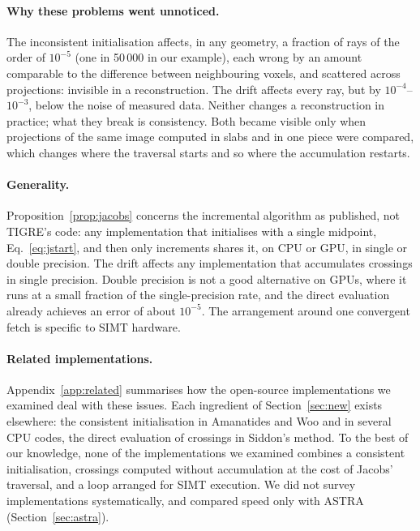 \documentclass[11pt,a4paper]{article}
\theoremstyle{remark}
\begin{document}
\paragraph{Why these problems went unnoticed.} The inconsistent initialisation affects, in any geometry, a
fraction of rays of the order of $10^{-5}$ (one in 50\,000 in our example), each wrong by an amount comparable
to the difference between neighbouring voxels, and scattered across projections: invisible in a
reconstruction. The drift affects every ray, but by $10^{-4}$--$10^{-3}$, below the noise of measured data.
Neither changes a reconstruction in practice; what they break is consistency. Both became visible only when
projections of the same image computed in slabs and in one piece were compared, which changes where the
traversal starts and so where the accumulation restarts.

\paragraph{Generality.} Proposition~\ref{prop:jacobs} concerns the incremental algorithm as published, not
TIGRE's code: any implementation that initialises with a single midpoint, Eq.~\eqref{eq:jstart}, and then
only increments shares it, on CPU or GPU, in single or double precision. The drift affects any implementation
that accumulates crossings in single precision. Double precision is not a good alternative on GPUs, where it
runs at a small fraction of the single-precision rate, and the direct evaluation already achieves an error of
about $10^{-5}$. The arrangement around one convergent fetch is specific to SIMT hardware.

\paragraph{Related implementations.} Appendix~\ref{app:related} summarises how the open-source
implementations we examined deal with these issues. Each ingredient of Section~\ref{sec:new} exists
elsewhere: the consistent initialisation in Amanatides and Woo and in several CPU codes, the direct
evaluation of crossings in Siddon's method. To the best of our knowledge, none of the implementations we
examined combines a consistent initialisation, crossings computed without accumulation at the cost of
Jacobs' traversal, and a loop arranged for SIMT execution. We did not survey implementations systematically,
and compared speed only with ASTRA (Section~\ref{sec:astra}).
\end{document}
